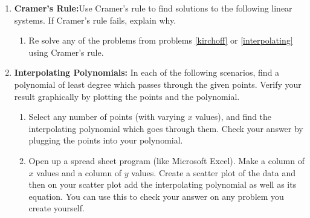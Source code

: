 \begin{enumerate}
\item  {\bf Cramer's Rule:}\label{cramer}Use Cramer's rule to find solutions to the following linear systems. If Cramer's rule fails, explain why.

\begin{enumerate}
\item Re solve any of the problems from problems \ref{kirchoff} or \ref{interpolating} using Cramer's rule.
\end{enumerate}





\item {\bf Interpolating Polynomials:} \label{interpolating}In each of the following scenarios, find a polynomial of least degree which passes through the given points. Verify your result graphically by plotting the points and the polynomial.
\begin{enumerate}
\item Select any number of points (with varying $x$ values), and find the interpolating polynomial which goes through them. Check your answer by plugging the points into your polynomial.
\item Open up a spread sheet program (like Microsoft Excel). Make a column of $x$ values and a column of $y$ values. Create a scatter plot of the data and then on your scatter plot add the interpolating polynomial as well as its equation. You can use this to check your answer on any problem you create yourself.
\end{enumerate}




\end{enumerate}
